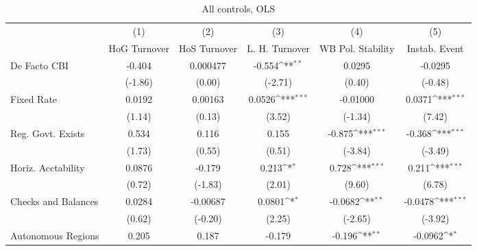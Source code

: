 \begin{table}[htbp]\centering
\def\sym#1{\ifmmode^{#1}\else\(^{#1}\)\fi}
\caption{All controls, OLS \label{fullcmultIndOLSDF}}
\begin{tabular}{l*{5}{c}}
\toprule
                                        &\multicolumn{1}{c}{(1)}&\multicolumn{1}{c}{(2)}&\multicolumn{1}{c}{(3)}&\multicolumn{1}{c}{(4)}&\multicolumn{1}{c}{(5)}\\
                                        &\multicolumn{1}{c}{HoG Turnover}&\multicolumn{1}{c}{HoS Turnover}&\multicolumn{1}{c}{L. H. Turnover}&\multicolumn{1}{c}{WB Pol. Stability}&\multicolumn{1}{c}{Instab. Event}\\
\midrule
De Facto CBI                            &   -0.404         & 0.000477         &   -0.554\sym{**} &   0.0295         &  -0.0295         \\
                                        &  (-1.86)         &   (0.00)         &  (-2.71)         &   (0.40)         &  (-0.48)         \\
\addlinespace
Fixed Rate                              &   0.0192         &  0.00163         &   0.0526\sym{***}& -0.01000         &   0.0371\sym{***}\\
                                        &   (1.14)         &   (0.13)         &   (3.52)         &  (-1.34)         &   (7.42)         \\
\addlinespace
Reg. Govt. Exists                       &    0.534         &    0.116         &    0.155         &   -0.875\sym{***}&   -0.368\sym{***}\\
                                        &   (1.73)         &   (0.55)         &   (0.51)         &  (-3.84)         &  (-3.49)         \\
\addlinespace
Horiz. Acctability                      &   0.0876         &   -0.179         &    0.213\sym{*}  &    0.728\sym{***}&    0.211\sym{***}\\
                                        &   (0.72)         &  (-1.83)         &   (2.01)         &   (9.60)         &   (6.78)         \\
\addlinespace
Checks and Balances                     &   0.0284         & -0.00687         &   0.0801\sym{*}  &  -0.0682\sym{**} &  -0.0478\sym{***}\\
                                        &   (0.62)         &  (-0.20)         &   (2.25)         &  (-2.65)         &  (-3.92)         \\
\addlinespace
Autonomous Regions                      &    0.205         &    0.187         &   -0.179         &   -0.196\sym{**} &  -0.0962\sym{*}  \\

\end{tabular}
\end{table}
